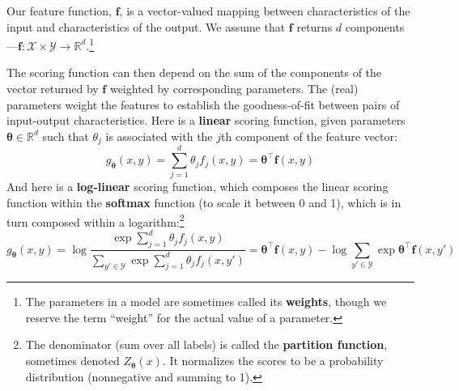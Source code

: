 \documentclass[11pt,letterpaper]{article}
\begin{document}
Our feature function, $\mathbf{f}$, is a vector-valued mapping between 
characteristics of the input and characteristics of the output.
We assume that $\mathbf{f}$ returns $d$ components---$\mathbf{f}: \mathcal{X}\times\mathcal{Y}\rightarrow\mathbb{R}^d$.\footnote{The parameters in a model are sometimes called its {\bf weights}, 
though we reserve the term ``weight'' for the actual value of a parameter.}

The scoring function can then depend on the sum of the components of the vector returned by $\mathbf{f}$ weighted by corresponding parameters.
The (real) parameters weight the features to establish the goodness-of-fit between pairs of input-output characteristics.  
Here is a {\bf linear} scoring function, 
given parameters $\boldsymbol{\theta}\in\mathbb{R}^d$ such that $\theta_j$ is associated with the $j$th component of the feature vector:
\begin{equation}\label{eq:linear}
g_{\boldsymbol{\theta}}(x,y) = \sum_{j=1}^d \theta_j f_j(x,y)
= \boldsymbol{\theta}^{\top} \mathbf{f}(x,y)
\end{equation}
And here is a {\bf log-linear} scoring function, which composes the linear scoring function within the 
{\bf softmax} function (to scale it between 0 and 1), which is in turn composed within a logarithm:\footnote{The denominator (sum over all labels) is called the {\bf partition function}, sometimes denoted $Z_{\boldsymbol{\theta}}(x)$. It normalizes the scores to be a probability distribution (nonnegative and summing to 1).}
\begin{equation}\label{eq:softmax}
g_{\boldsymbol{\theta}}(x,y) = \log\frac{\exp{\sum_{j=1}^d \theta_j f_j(x,y)}}{\sum_{y'\in\mathcal{Y}}\exp{\sum_{j=1}^d \theta_j f_j(x,y')}}
= \boldsymbol{\theta}^{\top} \mathbf{f}(x,y) - \log{\sum_{y'\in\mathcal{Y}}\exp{\boldsymbol{\theta}^{\top} \mathbf{f}(x,y')}}
\end{equation}
\end{document}
